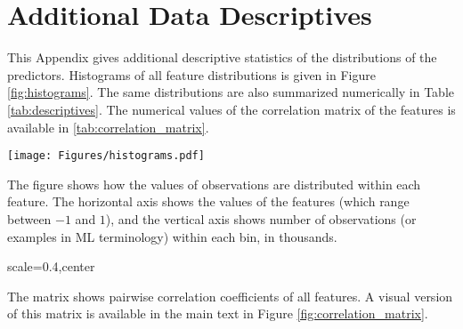 \chapter{Additional Data Descriptives}
\label{chap:additional_figures} 

This Appendix gives additional descriptive statistics of the distributions of the predictors. Histograms of all feature distributions is given in Figure \ref{fig:histograms}. The same distributions are also summarized numerically in Table \ref{tab:descriptives}. The numerical values of the correlation matrix of the features is available in \ref{tab:correlation_matrix}.
 
\begin{center}
	\begin{sidewaysfigure}
		\texttt{[image: Figures/histograms.pdf]}
		\caption{Histograms of All Features}
		\label{fig:histograms}
		\medskip
		\small
		The figure shows how the values of observations are distributed within each feature. The horizontal axis shows the values of the features (which range between $-1$ and $1$), and the vertical axis shows number of observations (or examples in ML terminology) within each bin, in thousands.  
	\end{sidewaysfigure}
\end{center}  
 
\begin{table}
	\resizebox{\textwidth}{!}{}
	\caption{Descriptive Statistics of the Features}
	\label{tab:descriptives}
\end{table} 
 
\begin{sidewaystable}
	\begin{adjustbox}{scale=0.4,center}
		
	\end{adjustbox}
	\caption{Features Correlation Matrix}
	\label{tab:correlation_matrix}
	\medspace
	\small
	The matrix shows pairwise correlation coefficients of all features. A visual version of this matrix is available in the main text in Figure \ref{fig:correlation_matrix}.
\end{sidewaystable}



